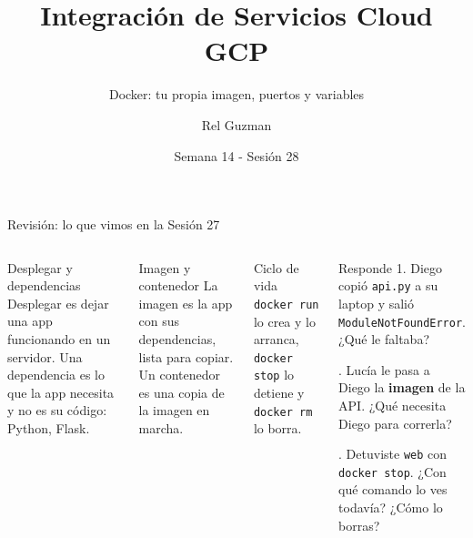 \documentclass[aspectratio=169,10pt,c]{beamer}
\title{Integración de Servicios Cloud GCP}
\subtitle{Docker: tu propia imagen, puertos y variables}
\date{Semana 14 - Sesión 28}
\author{Rel Guzman}
\begin{document}
{\maketitle}

\begin{frame}{Revisión: lo que vimos en la Sesión 27}
\begin{columns}[T,onlytextwidth]
\begin{block}{Desplegar y dependencias}
\small Desplegar es dejar una app funcionando en un servidor. Una dependencia es lo que la app necesita y no es su código: Python, Flask.
\end{block}
\begin{block}{Imagen y contenedor}
\small La imagen es la app con sus dependencias, lista para copiar. Un contenedor es una copia de la imagen en marcha.
\end{block}
\begin{block}{Ciclo de vida}
\small \texttt{docker run} lo crea y lo arranca, \texttt{docker stop} lo detiene y \texttt{docker rm} lo borra.
\end{block}
\begin{alertblock}{Responde}
\small
1. Diego copió \texttt{api.py} a su laptop y salió \texttt{ModuleNotFoundError}. ¿Qué le faltaba?\par{}. Lucía le pasa a Diego la \textbf{imagen} de la API. ¿Qué necesita Diego para correrla?\par{}. Detuviste \texttt{web} con \texttt{docker stop}. ¿Con qué comando lo ves todavía? ¿Cómo lo borras?
\end{alertblock}
\end{columns}
\end{frame}
\end{document}
